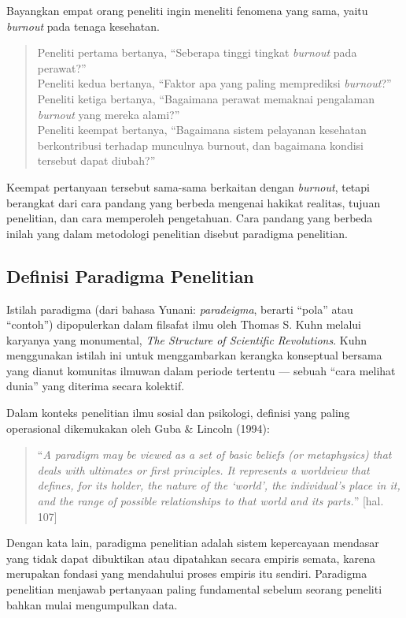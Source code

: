 \documentclass[
  indonesian,
  letterpaper,
  DIV=11,
  numbers=noendperiod]{scrreprt}
\begin{document}
Bayangkan empat orang peneliti ingin meneliti fenomena yang sama, yaitu
\emph{burnout} pada tenaga kesehatan.

\begin{quote}
Peneliti pertama bertanya, ``Seberapa tinggi tingkat \emph{burnout} pada
perawat?''\\
Peneliti kedua bertanya, ``Faktor apa yang paling memprediksi
\emph{burnout}?''\\
Peneliti ketiga bertanya, ``Bagaimana perawat memaknai pengalaman
\emph{burnout} yang mereka alami?''\\
Peneliti keempat bertanya, ``Bagaimana sistem pelayanan kesehatan
berkontribusi terhadap munculnya burnout, dan bagaimana kondisi tersebut
dapat diubah?''
\end{quote}

Keempat pertanyaan tersebut sama-sama berkaitan dengan \emph{burnout},
tetapi berangkat dari cara pandang yang berbeda mengenai hakikat
realitas, tujuan penelitian, dan cara memperoleh pengetahuan. Cara
pandang yang berbeda inilah yang dalam metodologi penelitian disebut
paradigma penelitian.

\subsection{Definisi Paradigma
Penelitian}\label{definisi-paradigma-penelitian}

Istilah paradigma (dari bahasa Yunani: \emph{paradeigma}, berarti
``pola'' atau ``contoh'') dipopulerkan dalam filsafat ilmu oleh Thomas
S. Kuhn melalui karyanya yang monumental, \emph{The Structure of
Scientific Revolutions}. Kuhn menggunakan istilah ini untuk
menggambarkan kerangka konseptual bersama yang dianut komunitas ilmuwan
dalam periode tertentu --- sebuah ``cara melihat dunia'' yang diterima
secara kolektif.

Dalam konteks penelitian ilmu sosial dan psikologi, definisi yang paling
operasional dikemukakan oleh Guba \& Lincoln (1994):

\begin{quote}
``\emph{A paradigm may be viewed as a set of basic beliefs (or
metaphysics) that deals with ultimates or first principles. It
represents a worldview that defines, for its holder, the nature of the
`world', the individual's place in it, and the range of possible
relationships to that world and its parts.}'' {[}hal. 107{]}
\end{quote}

Dengan kata lain, paradigma penelitian adalah sistem kepercayaan
mendasar yang tidak dapat dibuktikan atau dipatahkan secara empiris
semata, karena merupakan fondasi yang mendahului proses empiris itu
sendiri. Paradigma penelitian menjawab pertanyaan paling fundamental
sebelum seorang peneliti bahkan mulai mengumpulkan data.
\end{document}
